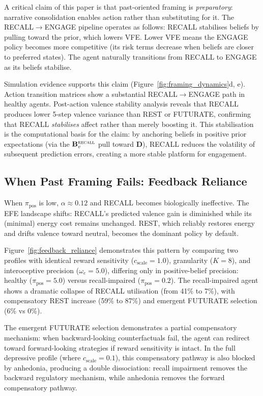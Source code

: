 \documentclass[11pt,a4paper]{article}
\begin{document}
A critical claim of this paper is that past-oriented framing is \emph{preparatory}: narrative consolidation enables action rather than substituting for it. The RECALL$\to$ENGAGE pipeline operates as follows: RECALL stabilises beliefs by pulling toward the prior, which lowers VFE. Lower VFE means the ENGAGE policy becomes more competitive (its risk terms decrease when beliefs are closer to preferred states). The agent naturally transitions from RECALL to ENGAGE as its beliefs stabilise.

Simulation evidence supports this claim (Figure~\ref{fig:framing_dynamics}d, e). Action transition matrices show a substantial RECALL$\to$ENGAGE path in healthy agents. Post-action valence stability analysis reveals that RECALL produces lower 5-step valence variance than REST or FUTURATE, confirming that RECALL \emph{stabilises} affect rather than merely boosting it. This stabilisation is the computational basis for the claim: by anchoring beliefs in positive prior expectations (via the $\mathbf{B}_v^{\textsc{recall}}$ pull toward $\mathbf{D}$), RECALL reduces the volatility of subsequent prediction errors, creating a more stable platform for engagement.

\subsection{When Past Framing Fails: Feedback Reliance}\label{sec:feedback_reliance}

When $\pi_{\text{pos}}$ is low, $\alpha \approx 0.12$ and RECALL becomes biologically ineffective. The EFE landscape shifts: RECALL's predicted valence gain is diminished while its (minimal) energy cost remains unchanged. REST, which reliably restores energy and drifts valence toward neutral, becomes the dominant policy by default.

Figure~\ref{fig:feedback_reliance} demonstrates this pattern by comparing two profiles with identical reward sensitivity ($c_{\text{scale}} = 1.0$), granularity ($K = 8$), and interoceptive precision ($\omega_e = 5.0$), differing only in positive-belief precision: healthy ($\pi_{\text{pos}} = 5.0$) versus recall-impaired ($\pi_{\text{pos}} = 0.2$). The recall-impaired agent shows a dramatic collapse of RECALL utilisation (from 41\% to 7\%), with compensatory REST increase (59\% to 87\%) and emergent FUTURATE selection (6\% vs 0\%).

The emergent FUTURATE selection demonstrates a partial compensatory mechanism: when backward-looking counterfactuals fail, the agent can redirect toward forward-looking strategies if reward sensitivity is intact. In the full depressive profile (where $c_{\text{scale}} = 0.1$), this compensatory pathway is also blocked by anhedonia, producing a double dissociation: recall impairment removes the backward regulatory mechanism, while anhedonia removes the forward compensatory pathway.
\end{document}
